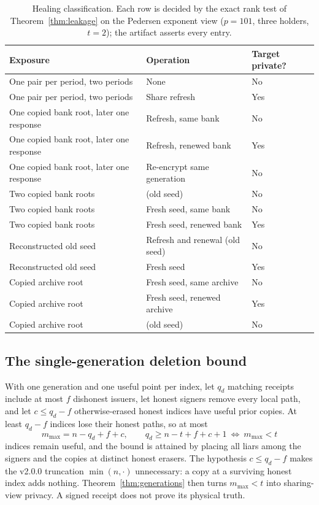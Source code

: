 \documentclass[pdflatex,sn-mathphys-num]{sn-jnl}
\theoremstyle{plain}
\theoremstyle{definition}
\begin{document}
\begin{table}[htbp]
\caption{Healing classification. Each row is decided by the exact rank test of Theorem~\ref{thm:leakage} on the Pedersen exponent view ($p=101$, three holders, $t=2$); the artifact asserts every entry.}\label{tab:healing}
\centering\footnotesize
\begin{tabularx}{\linewidth}{@{}p{.40\linewidth}p{.36\linewidth}Y@{}}\toprule
Exposure & Operation & Target private?\\\midrule
One pair per period, two periods & None & No\\
One pair per period, two periods & Share refresh & Yes\\
One copied bank root, later one response & Refresh, same bank & No\\
One copied bank root, later one response & Refresh, renewed bank & Yes\\
One copied bank root, later one response & Re-encrypt same generation & No\\
Two copied bank roots & (old seed) & No\\
Two copied bank roots & Fresh seed, same bank & No\\
Two copied bank roots & Fresh seed, renewed bank & Yes\\
Reconstructed old seed & Refresh and renewal (old seed) & No\\
Reconstructed old seed & Fresh seed & Yes\\
Copied archive root & Fresh seed, same archive & No\\
Copied archive root & Fresh seed, renewed archive & Yes\\
Copied archive root & (old seed) & No\\\bottomrule
\end{tabularx}
\end{table}

\subsection{The single-generation deletion bound}
With one generation and one useful point per index, let $q_d$ matching receipts include at most $f$ dishonest issuers, let honest signers remove every local path, and let $c\le q_d-f$ otherwise-erased honest indices have useful prior copies. At least $q_d-f$ indices lose their honest paths, so at most
\begin{equation}\label{eq:deletion}
 m_{\max}=n-q_d+f+c,\qquad
 q_d\ge n-t+f+c+1\ \Longleftrightarrow\ m_{\max}<t
\end{equation}
indices remain useful, and the bound is attained by placing all liars among the signers and the copies at distinct honest erasers. The hypothesis $c\le q_d-f$ makes the v2.0.0 truncation $\min(n,\cdot)$ unnecessary: a copy at a surviving honest index adds nothing. Theorem~\ref{thm:generations} then turns $m_{\max}<t$ into sharing-view privacy. A signed receipt does not prove its physical truth.
\end{document}
